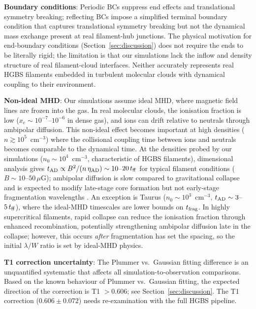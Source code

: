 \documentclass[twoside,twocolumn]{mnras}
\begin{document}
\textbf{Boundary conditions}: Periodic BCs suppress end effects and translational
symmetry breaking; reflecting BCs impose a simplified terminal boundary condition that captures translational symmetry breaking but not the dynamical mass exchange present at real filament-hub junctions. The physical motivation for end-boundary conditions (Section~\ref{sec:discussion}) does not require the ends to be literally rigid; the limitation is that our simulations lack the inflow and density structure of real filament-cloud interfaces. Neither accurately represents real HGBS filaments embedded in turbulent molecular clouds with dynamical coupling to their environment.

\textbf{Non-ideal MHD}: Our simulations assume ideal MHD, where magnetic field lines
are frozen into the gas. In real molecular clouds, the ionisation fraction is low
($x_e \sim 10^{-7}$--$10^{-6}$ in dense gas), and ions can drift relative to neutrals
through ambipolar diffusion. This non-ideal effect becomes important at high densities
($n \gtrsim 10^5$~cm$^{-3}$) where the collisional coupling time between ions and
neutrals becomes comparable to the dynamical time. At the densities probed by our
simulations ($n_0 \sim 10^4$~cm$^{-3}$, characteristic of HGBS filaments), dimensional
analysis gives $t_{\rm AD} \propto B^2 / (n\,\eta_{\rm AD}) \sim 10$--$20\,t_{\rm ff}$
for typical filament conditions ($B \sim 10$--$50\,\mu$G); ambipolar diffusion is slow
compared to gravitational collapse and is expected to modify late-stage core formation
but not early-stage fragmentation wavelengths \citep{Nakamura2005, Tassis2004}. An
exception is Taurus ($n_0 \sim 10^3$~cm$^{-3}$, $t_{\rm AD} \sim 3$--$5\,t_{\rm ff}$),
where the ideal-MHD timescales are lower bounds on $t_{\rm frag}$. In highly supercritical
filaments, rapid collapse can reduce the ionisation fraction through enhanced recombination,
potentially strengthening ambipolar diffusion late in the collapse; however, this occurs
\textit{after} fragmentation has set the spacing, so the initial $\lambda/W$ ratio is set
by ideal-MHD physics.

\textbf{T1 correction uncertainty}: The Plummer vs.\ Gaussian fitting difference is an unquantified systematic that affects all simulation-to-observation comparisons. Based on the known behaviour of Plummer vs.\ Gaussian fitting, the expected direction of the correction is T1 $> 0.606$; see Section~\ref{sec:discussion}. The
T1 correction ($0.606 \pm 0.072$) needs re-examination with the full HGBS pipeline.
\end{document}
